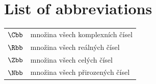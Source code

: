 \chapter*{List of abbreviations}
\begin{flushleft}
\begin{longtable}[l]{ll} %
  $\Cbb$                 & množina všech komplexních čísel \\[1mm]
  $\Rbb$                 & množina všech reálných čísel \\[1mm]
  $\Zbb$                 & množina všech celých čísel \\[1mm]
  $\Nbb$                 & množina všech přirozených čísel\\
\end{longtable}
\end{flushleft}
